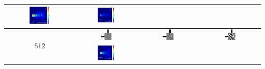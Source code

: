 \begin{table}[ht]
\begin{tabular}{|c|c|c|c|}
      \includegraphics[width=0.33\textwidth]{image/results/bend/MMA/visualize_field_disc_256.png} &
      \includegraphics[width=0.33\textwidth]{image/results/bend/MMA/visualize_field_fab_256.png} \\
    \hline
      \multirow{2}{*}{512} &
      \includegraphics[width=0.20\textwidth]{image/results/bend/MMA/visualize_eps_cont_512.png} &
      \includegraphics[width=0.20\textwidth]{image/results/bend/MMA/visualize_eps_disc_512.png} &
      \includegraphics[width=0.20\textwidth]{image/results/bend/MMA/visualize_eps_fab_512.png} \\
      \cline{2-4}
      &
      \includegraphics[width=0.33\textwidth]{image/results/bend/MMA/visualize_field_cont_512.png} &

\end{tabular}
\end{table}
